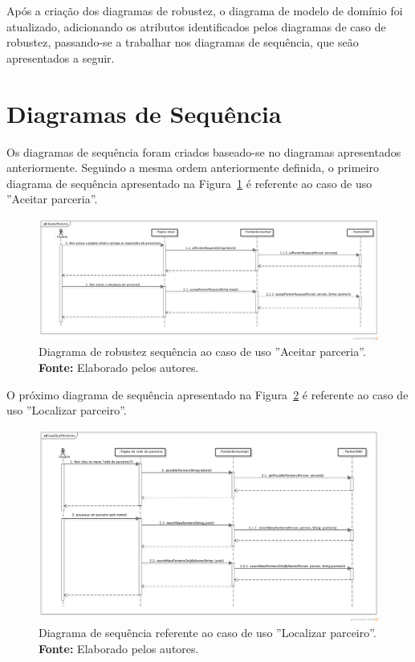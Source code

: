 Após a criação dos diagramas de robustez, o diagrama de modelo de domínio foi atualizado, adicionando os atributos identificados pelos diagramas de caso de robustez, passando-se a trabalhar nos diagramas de sequência, que seão apresentados a seguir.

\section*{Diagramas de Sequência}

Os diagramas de sequência foram criados baseado-se no diagramas apresentados anteriormente. Seguindo a mesma ordem anteriormente definida, o primeiro diagrama de sequência apresentado na Figura~\ref{fig:ap1:diagrama_sequencia_aceitar_parceria} é referente ao caso de uso ''Aceitar parceria''.

\newpage
\captionsetup[figure]{list=no}
\begin{figure}[h!]
	\centerline{\includegraphics[angle=90,scale=0.42]{./imagens/apendices/diagrama-sequencia-aceitar-parceria.png}}
	\caption[Diagrama de sequência referente ao caso de uso ''Aceitar parceria''.]
	{Diagrama de robustez sequência ao caso de uso ''Aceitar parceria''. \textbf{Fonte:} Elaborado pelos autores.}
	\label{fig:ap1:diagrama_sequencia_aceitar_parceria}
\end{figure}

O próximo diagrama de sequência apresentado na Figura~\ref{fig:ap1:diagrama_sequencia_localizar_parceiro} é referente ao caso de uso ''Localizar parceiro''.

\newpage
\captionsetup[figure]{list=no}
\begin{figure}[h!]
	\centerline{\includegraphics[angle=90,scale=0.42]{./imagens/apendices/diagrama-sequencia-localizar-parceiros.png}}
	\caption[Diagrama de sequência referente ao caso de uso ''Localizar parceiro''.]
	{Diagrama de sequência referente ao caso de uso ''Localizar parceiro''. \textbf{Fonte:} Elaborado pelos autores.}
	\label{fig:ap1:diagrama_sequencia_localizar_parceiro}
\end{figure}

